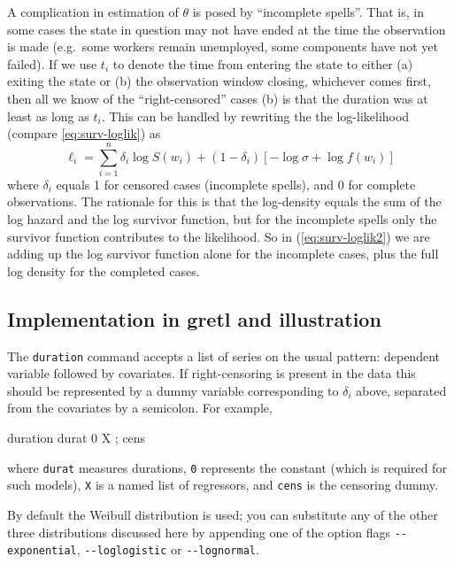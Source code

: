 A complication in estimation of $\theta$ is posed by ``incomplete
spells''. That is, in some cases the state in question may not have
ended at the time the observation is made (e.g.\ some workers remain
unemployed, some components have not yet failed).  If we use $t_i$ to
denote the time from entering the state to either (a) exiting the
state or (b) the observation window closing, whichever comes first,
then all we know of the ``right-censored'' cases (b) is that the
duration was at least as long as $t_i$. This can be handled by
rewriting the the log-likelihood (compare \ref{eq:surv-loglik}) as
\begin{equation}
\label{eq:surv-loglik2}
\ell_i = \sum_{i=1}^n \delta_i\log S\left(w_i\right)
+ \left(1-\delta_i\right) 
\left[-\log\sigma + \log f\left(w_i\right)\right]
\end{equation}
where $\delta_i$ equals 1 for censored cases (incomplete spells), and
0 for complete observations. The rationale for this is that the
log-density equals the sum of the log hazard and the log survivor
function, but for the incomplete spells only the survivor function
contributes to the likelihood. So in (\ref{eq:surv-loglik2}) we are
adding up the log survivor function alone for the incomplete cases,
plus the full log density for the completed cases.

\subsection{Implementation in gretl and illustration}

The \texttt{duration} command accepts a list of series on the usual
pattern: dependent variable followed by covariates. If right-censoring
is present in the data this should be represented by a dummy variable
corresponding to $\delta_i$ above, separated from the covariates by
a semicolon. For example,
\begin{code}
duration durat 0 X ; cens
\end{code}
where \texttt{durat} measures durations, \texttt{0} represents the
constant (which is required for such models), \texttt{X} is a named
list of regressors, and \texttt{cens} is the censoring dummy.

By default the Weibull distribution is used; you can substitute any of
the other three distributions discussed here by appending one of the
option flags \verb|--exponential|, \verb|--loglogistic| or 
\verb|--lognormal|.


